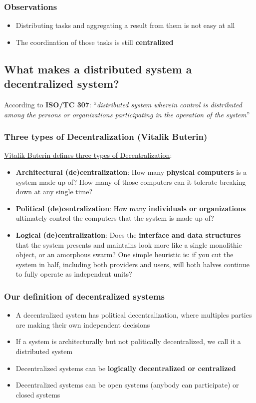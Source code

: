 \documentclass[12pt,A4]{extarticle}
\begin{document}
\subsubsection{Observations}
\begin{itemize}
  \item{Distributing tasks and aggregating a result from them is not easy at all}
  \item{The coordination of those tasks is still \textbf{centralized}}
\end{itemize}

\subsection{What makes a distributed system a decentralized system?}
According to \textbf{ISO/TC 307}: ``\textit{distributed system wherein control is distributed among the persons or organizations participating in the operation of the system}''

\subsubsection{Three types of Decentralization (Vitalik Buterin)}
\href{https://medium.com/@VitalikButerin/the-meaning-of-decentralization-a0c92b76a274}{Vitalik Buterin defines three types of Decentralization}:
\begin{itemize}
  \item{\textbf{Architectural (de)centralization}: How many \textbf{physical computers} is a system made up of? How many of those computers can it tolerate breaking down at any single time?}
  \item{\textbf{Political (de)centralization}: How many \textbf{individuals or organizations} ultimately control the computers that the system is made up of?}
  \item{\textbf{Logical (de)centralization}: Does the \textbf{interface and data structures} that the system presents and maintains look more like a single monolithic object, or an amorphous swarm? One simple heuristic is: if you cut the system in half, including both providers and users, will both halves continue to fully operate as independent units?}
\end{itemize}

\subsubsection{Our definition of decentralized systems}
\begin{itemize}
  \item{A decentralized system has political decentralization, where multiples parties are making their own independent decisions}
  \item{If a system is architecturally but not politically decentralized, we call it a distributed system}
  \item{Decentralized systems can be \textbf{logically decentralized or centralized}}
  \item{Decentralized systems can be open systems (anybody can participate) or closed systems}
\end{itemize}
\end{document}
